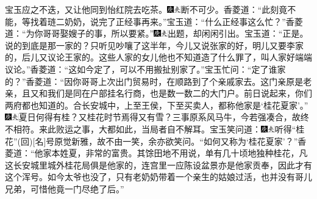 宝玉应之不迭，又让他同到怡红院去吃茶。{\includegraphics[width=3mm]{../Images/00004}\includegraphics[width=3mm]{../Images/00012}\footnotesize \kaishu 断不可少。}香菱道：``此刻竟不能，等找着琏二奶奶，说完了正经事再来。''宝玉道：``什么正经事这么忙？''香菱道：``为你哥哥娶嫂子的事，所以要紧。''{\includegraphics[width=3mm]{../Images/00004}\includegraphics[width=3mm]{../Images/00012}\footnotesize \kaishu 出题，却闲闲引出。}宝玉道：``正是。说的到底是那一家的？只听见吵嚷了这半年，今儿又说张家的好，明儿又要李家的，后儿又议论王家的。这些人家的女儿他也不知道造了什么罪了，叫人家好端端议论。''香菱道：``这如今定了，可以不用搬扯别家了。''宝玉忙问：``定了谁家的？''香菱道：``因你哥哥上次出门贸易时，在顺路到了个亲戚家去。这门亲原是老亲，且又和我们是同在户部挂名行商，也是数一数二的大门户。前日说起来，你们两府都也知道的。合长安城中，上至王侯，下至买卖人，都称他家是`桂花夏家'。''{\includegraphics[width=3mm]{../Images/00004}\includegraphics[width=3mm]{../Images/00012}\footnotesize \kaishu 夏日何得有桂？又桂花时节焉得又有雪？三事原系风马牛，今若强凑合，故终不相符。来此败运之事，大都如此，当局者自不解耳。}宝玉笑问道：{\includegraphics[width=3mm]{../Images/00004}\includegraphics[width=3mm]{../Images/00012}\footnotesize \kaishu 听得``桂花''{(回)}{[}名{]}号原觉新雅，故不由一笑，余亦欲笑问。}``如何又称为`桂花夏家'？''香菱道：``他家本姓夏，非常的富贵。其馀田地不用说，单有几十顷地独种桂花，凡这长安城里城外桂花局俱是他家的，连宫里一应陈设盆景亦是他家贡奉，因此才有这个浑号。如今太爷也没了，只有老奶奶带着一个亲生的姑娘过活，也并没有哥儿兄弟，可惜他竟一门尽绝了后。''

